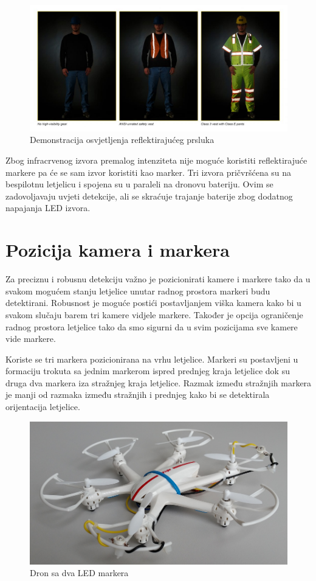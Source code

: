 \documentclass[times, utf8, diplomski]{fer}
\begin{document}
\begin{figure}[h]
\centering
\includegraphics[width=.9\textwidth]{retroreflective_vest}
\caption{Demonstracija osvjetljenja reflektirajućeg prsluka}
\label{fig:vesta}
\end{figure}

Zbog infracrvenog izvora premalog intenziteta nije moguće koristiti reflektirajuće markere pa će se sam izvor koristiti kao marker. Tri izvora pričvršćena su na bespilotnu letjelicu i spojena su u paraleli na dronovu bateriju. Ovim se zadovoljavaju uvjeti detekcije, ali se skraćuje trajanje baterije zbog dodatnog napajanja LED izvora. 

\section{Pozicija kamera i markera}
Za preciznu i robusnu detekciju važno je pozicionirati kamere i markere tako da u svakom mogućem stanju letjelice unutar radnog prostora markeri budu detektirani. Robusnost je moguće postići postavljanjem viška kamera kako bi u svakom slučaju barem tri kamere vidjele markere. Također je opcija ograničenje radnog prostora letjelice tako da smo sigurni da u svim pozicijama sve kamere vide markere. 

Koriste se tri markera pozicionirana na vrhu letjelice. Markeri su postavljeni u formaciju trokuta sa jednim markerom ispred prednjeg kraja letjelice dok su druga dva markera iza stražnjeg kraja letjelice. Razmak između stražnjih markera je manji od razmaka između stražnjih i prednjeg kako bi se detektirala orijentacija letjelice.

\begin{figure}[h]
\centering
\includegraphics[width=.7\textwidth]{2led_side}
\caption{Dron sa dva LED markera}
\label{fig:2led_side}
\end{figure} 
\end{document}

